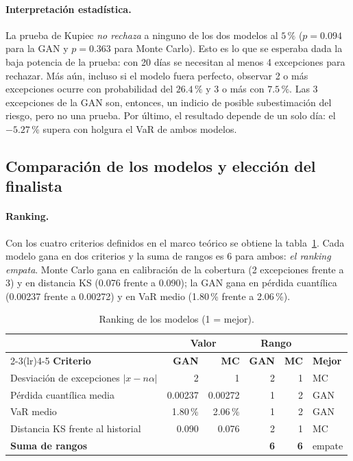 \documentclass[12pt,letterpaper]{article}
\begin{document}
\paragraph{Interpretación estadística.}
La prueba de Kupiec \emph{no rechaza} a ninguno de los dos modelos al $5\,\%$ ($p=0.094$ para la GAN y $p=0.363$ para Monte Carlo). Esto es lo que se esperaba dada la baja potencia de la prueba: con 20 días se necesitan al menos 4 excepciones para rechazar. Más aún, incluso si el modelo fuera perfecto, observar 2 o más excepciones ocurre con probabilidad del $26.4\,\%$ y 3 o más con $7.5\,\%$. Las 3 excepciones de la GAN son, entonces, un indicio de posible subestimación del riesgo, pero no una prueba. Por último, el resultado depende de un solo día: el $-5.27\,\%$ supera con holgura el VaR de ambos modelos.

\subsection{Comparación de los modelos y elección del finalista}\label{sec:comparacion}

\paragraph{Ranking.}
Con los cuatro criterios definidos en el marco teórico se obtiene la tabla~\ref{tab:ranking}. Cada modelo gana en dos criterios y la suma de rangos es 6 para ambos: \emph{el ranking empata}. Monte Carlo gana en calibración de la cobertura (2 excepciones frente a 3) y en distancia KS (0.076 frente a 0.090); la GAN gana en pérdida cuantílica (0.00237 frente a 0.00272) y en VaR medio (1.80\,\% frente a 2.06\,\%).

\begin{table}[H]
\centering
\renewcommand{\arraystretch}{1.2}
\begin{tabular}{@{}lrrrrl@{}}
\toprule
 & \multicolumn{2}{c}{\textbf{Valor}} & \multicolumn{2}{c}{\textbf{Rango}} & \\
\cmidrule(lr){2-3}\cmidrule(lr){4-5}
\textbf{Criterio} & \textbf{GAN} & \textbf{MC} & \textbf{GAN} & \textbf{MC} & \textbf{Mejor}\\
\midrule
Desviación de excepciones $|x-n\alpha|$ & 2 & 1 & 2 & 1 & MC\\
Pérdida cuantílica media & 0.00237 & 0.00272 & 1 & 2 & GAN\\
VaR medio & 1.80\,\% & 2.06\,\% & 1 & 2 & GAN\\
Distancia KS frente al historial & 0.090 & 0.076 & 2 & 1 & MC\\
\midrule
\textbf{Suma de rangos} & & & \textbf{6} & \textbf{6} & empate\\
\bottomrule
\end{tabular}
\caption{Ranking de los modelos (1 = mejor).}\label{tab:ranking}
\end{table}
\end{document}
